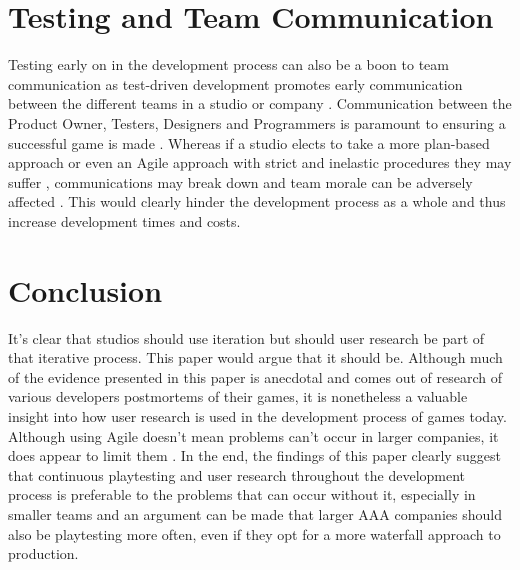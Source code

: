 \documentclass{scrartcl}
\begin{document}
\section{Testing and Team Communication}

Testing early on in the development process can also be a boon to team communication as test-driven development promotes early communication between the different teams in a studio or company \cite{gallardo2009continuous:17}. Communication between the Product Owner, Testers, Designers and Programmers is paramount to ensuring a successful game is made \cite{mcdaniel2015communication:18}. 
Whereas if a studio elects to take a more plan-based approach or even an Agile approach with strict and inelastic procedures they may suffer \cite{cooke2012everything:19} \cite{davis2012agile:20}, communications may break down and team morale can be adversely affected \cite{cunningham2005costs:11}. This would clearly hinder the development process as a whole and thus increase development times and costs.


\section{Conclusion}

It's clear that studios should use iteration \cite{o2015towards:21} \cite{al2014towards:22} but should user research be part of that iterative process. This paper would argue that it should be. Although much of the evidence presented in this paper is anecdotal and comes out of research of various developers postmortems of their games, it is nonetheless a valuable insight into how user research is used in the development process of games today. Although using Agile doesn't mean problems can't occur in larger companies, it does appear to limit them \cite{rico2009business:23} \cite{batra2010balancing:24}. In the end, the findings of this paper clearly suggest that continuous playtesting and user research throughout the development process is preferable to the problems that can occur without it, especially in smaller teams and an argument can be made that larger AAA companies should also be playtesting more often, even if they opt for a more waterfall approach to production.



\end{document}
